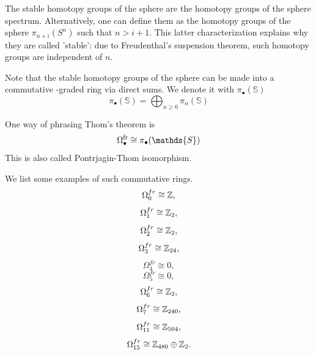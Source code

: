 \begin{notat}
    The stable homotopy groups of the sphere are the homotopy groups of the sphere spectrum. Alternatively, one can define them as the homotopy groups of the sphere $\pi_{n+i}(S^n)$ such that $n>i+1$. This latter
     characterization explains why they are called 'stable': due to Freudenthal's suspension theorem, such homotopy
     groups are independent of $n$.
\end{notat}
\begin{rem}
Note that the stable homotopy groups of the sphere can be made into a commutative \Z-graded ring via direct sums. We denote it with $\pi_{\bullet}(\mathds{S})$
$$\pi_{\bullet}(\mathds{S})=\bigoplus_{n\geq 0}\pi_{n}(\mathds{S})$$
\end{rem}
\begin{thm}
    One way of phrasing Thom's theorem is
    $$\Omega_{\bullet}^{\fr}\cong\pi_{\bullet}(\mathds{S})$$
    This is also called Pontrjagin-Thom isomorphism.
\end{thm}
\begin{ex}
 We list some examples of such commutative rings.
 $$    \Omega^{fr}_0 \cong\mathbb{Z},$$
  $$\Omega^{fr}_1 \cong\mathbb{Z}_2,$$
  $$\Omega^{fr}_2 \cong \mathbb{Z}_2,$$
  $$\Omega^{fr}_3 \cong\mathbb{Z}_{24},$$
  $$\Omega^{fr}_4 \cong 0,$$
  $$\Omega^{fr}_5 \cong 0,$$
  $$\Omega^{fr}_6 \cong\mathbb{Z}_2,$$
  $$\Omega^{fr}_7 \cong \mathbb{Z}_{240},$$
  $$\Omega^{fr}_{11} \cong\mathbb{Z}_{504},$$
  $$\Omega^{fr}_{15} \cong\mathbb{Z}_{480}\oplus\mathbb{Z}_2.$$
\end{ex}
